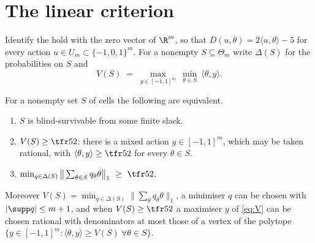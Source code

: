 \section{The linear criterion}\label{sec:criterion}

Identify the hold with the zero vector of $\R^m$, so that $D(u,\theta)=2\langle u,\theta\rangle-5$ for every action $u\in U_m\subset\{-1,0,1\}^m$. For a nonempty $S\subseteq\Theta_m$ write $\Delta(S)$ for the probabilities on $S$ and
\begin{equation}\label{eq:V}
V(S)\;=\;\max_{y\in[-1,1]^m}\ \min_{\theta\in S}\ \langle\theta,y\rangle .
\end{equation}

\begin{theorem}\label{thm:criterion}
For a nonempty set $S$ of cells the following are equivalent.
\begin{enumerate}[label=(\roman*),leftmargin=2.2em,itemsep=1pt]
\item $S$ is blind-survivable from some finite slack.
\item $V(S)\ge\tfr52$: there is a mixed action $y\in[-1,1]^m$, which may be taken rational, with $\langle\theta,y\rangle\ge\tfr52$ for every $\theta\in S$.
\item $\min_{q\in\Delta(S)}\big\|\sum_{\theta\in S}q_\theta\theta\big\|_1\ \ge\ \tfr52$.
\end{enumerate}
Moreover $V(S)=\min_{q\in\Delta(S)}\|\sum_\theta q_\theta\theta\|_1$, a minimiser $q$ can be chosen with $|\supp q|\le m+1$, and when $V(S)\ge\tfr52$ a maximiser $y$ of \eqref{eq:V} can be chosen rational with denominators at most those of a vertex of the polytope $\{y\in[-1,1]^m:\langle\theta,y\rangle\ge V(S)\ \forall\theta\in S\}$.
\end{theorem}

